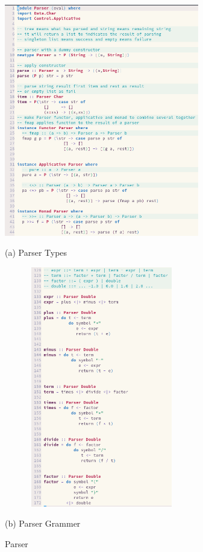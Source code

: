 \documentclass{article}
\begin{document}
\begin{normalsize}
  \begin{figure}[H]
    \begin{minipage}[b]{0.48\linewidth}
      \centering
      \centerline{\includegraphics[width=8.5cm]{parserTypes}}
      \centerline{ (a) Parser Types}\medskip
    \end{minipage}
    \hfill
    \begin{minipage}[b]{0.48\linewidth}
      \centering
      \centerline{\includegraphics[width=8.5cm, height=10.5cm]{parserGrammar}}
      \centerline{ (b) Parser Grammer }\medskip
    \end{minipage}
    \caption{Parser}
    \label{fig:parser}
  \end{figure}


\end{normalsize}
\end{document}
